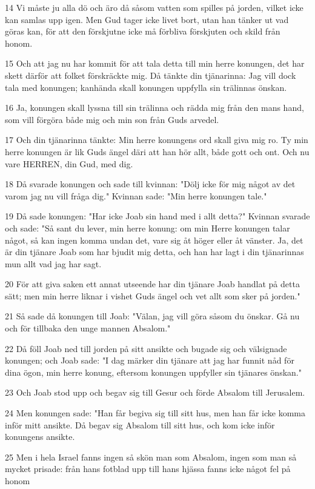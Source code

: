 \par 14 Vi måste ju alla dö och äro då såsom vatten som spilles på jorden, vilket icke kan samlas upp igen. Men Gud tager icke livet bort, utan han tänker ut vad göras kan, för att den förskjutne icke må förbliva förskjuten och skild från honom.
\par 15 Och att jag nu har kommit för att tala detta till min herre konungen, det har skett därför att folket förskräckte mig. Då tänkte din tjänarinna: Jag vill dock tala med konungen; kanhända skall konungen uppfylla sin trälinnas önskan.
\par 16 Ja, konungen skall lyssna till sin trälinna och rädda mig från den mans hand, som vill förgöra både mig och min son från Guds arvedel.
\par 17 Och din tjänarinna tänkte: Min herre konungens ord skall giva mig ro. Ty min herre konungen är lik Guds ängel däri att han hör allt, både gott och ont. Och nu vare HERREN, din Gud, med dig.
\par 18 Då svarade konungen och sade till kvinnan: "Dölj icke för mig något av det varom jag nu vill fråga dig." Kvinnan sade: "Min herre konungen tale."
\par 19 Då sade konungen: "Har icke Joab sin hand med i allt detta?" Kvinnan svarade och sade: "Så sant du lever, min herre konung: om min Herre konungen talar något, så kan ingen komma undan det, vare sig åt höger eller åt vänster. Ja, det är din tjänare Joab som har bjudit mig detta, och han har lagt i din tjänarinnas mun allt vad jag har sagt.
\par 20 För att giva saken ett annat utseende har din tjänare Joab handlat på detta sätt; men min herre liknar i vishet Guds ängel och vet allt som sker på jorden."
\par 21 Så sade då konungen till Joab: "Välan, jag vill göra såsom du önskar. Gå nu och för tillbaka den unge mannen Absalom."
\par 22 Då föll Joab ned till jorden på sitt ansikte och bugade sig och välsignade konungen; och Joab sade: "I dag märker din tjänare att jag har funnit nåd för dina ögon, min herre konung, eftersom konungen uppfyller sin tjänares önskan."
\par 23 Och Joab stod upp och begav sig till Gesur och förde Absalom till Jerusalem.
\par 24 Men konungen sade: "Han får begiva sig till sitt hus, men han får icke komma inför mitt ansikte. Då begav sig Absalom till sitt hus, och kom icke inför konungens ansikte.
\par 25 Men i hela Israel fanns ingen så skön man som Absalom, ingen som man så mycket prisade: från hans fotblad upp till hans hjässa fanns icke något fel på honom
